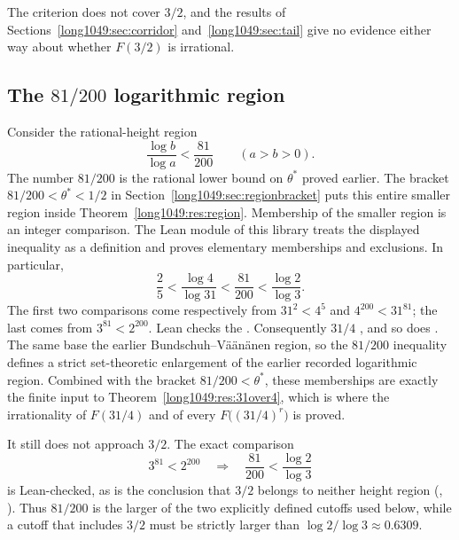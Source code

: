 \documentclass[11pt]{article}
\begin{document}
The criterion does not cover $3/2$, and the results of
Sections~\ref{long1049:sec:corridor} and~\ref{long1049:sec:tail} give no evidence either way
about whether $F(3/2)$ is irrational.

\subsection{The \texorpdfstring{$81/200$}{81/200} logarithmic region}

Consider the rational-height region
\[
 \frac{\log b}{\log a}<\frac{81}{200}
 \qquad(a>b>0).
\]
The number $81/200$ is the rational lower bound on $\theta^*$
proved earlier. The bracket
$81/200<\theta^{*}<1/2$ in Section~\ref{long1049:sec:regionbracket}
puts this entire smaller region inside
Theorem~\ref{long1049:res:region}. Membership of the smaller region is
an integer comparison.  The Lean module of
this library treats the displayed inequality as a definition and proves
elementary memberships and exclusions.  In particular,
\[
 \frac25
 <\frac{\log4}{\log31}
 <\frac{81}{200}
 <\frac{\log2}{\log3}.
\]
The first two comparisons come respectively from $31^2<4^5$ and
$4^{200}<31^{81}$; the last comes from $3^{81}<2^{200}$.  Lean checks the
.  Consequently $31/4$
,
and so does
.
The same base
the earlier Bundschuh--V\"a\"an\"anen region, so the $81/200$ inequality defines a strict set-theoretic enlargement of the
earlier recorded logarithmic region.  Combined with the bracket
$81/200<\theta^{*}$, these memberships are exactly the finite input to
Theorem~\ref{long1049:res:31over4}, which is where the irrationality of $F(31/4)$ and of
every $F\bigl((31/4)^{r}\bigr)$ is proved.

It still does not approach $3/2$.  The exact comparison
\[
 3^{81}<2^{200}
 \quad\Longrightarrow\quad
 \frac{81}{200}<\frac{\log2}{\log3}
\]
is Lean-checked, as is the conclusion that $3/2$ belongs to neither height
region
(,
).
Thus $81/200$ is the larger of the two explicitly defined cutoffs used below,
while a cutoff that includes $3/2$ must be strictly larger than
$\log2/\log3\approx0.6309$.
\end{document}
